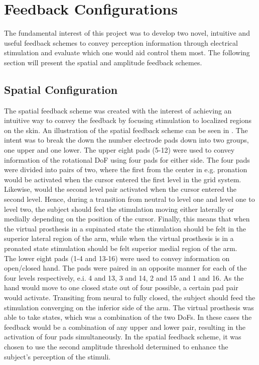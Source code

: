 \section{Feedback Configurations} \label{sec:feed}

The fundamental interest of this project was to develop two novel, intuitive and useful feedback schemes to convey perception information through electrical stimulation and evaluate which one would aid control them most. The following section will present the spatial and amplitude feedback schemes.     

\subsection{Spatial Configuration}

The spatial feedback scheme was created with the interest of achieving an intuitive way to convey the feedback by focusing stimulation to localized regions on the skin. An illustration of the spatial feedback scheme can be seen in . The intent was to break the down the number electrode pads down into two groups, one upper and one lower. The upper eight pads (5-12) were used to convey information of the rotational DoF using four pads for either side.  The four pads were divided into pairs of two, where the first from the center in e.g. pronation would be activated when the cursor entered the first level in the grid system. Likewise, would the second level pair activated when the cursor entered the second level. Hence, during a transition from neutral to level one and level one to level two, the subject should feel the stimulation moving either laterally or medially depending on the position of the cursor. Finally, this means that when the virtual prosthesis in a supinated state the stimulation should be felt in the superior lateral region of the arm, while when the virtual prosthesis is in a pronated state stimulation should be felt superior medial region of the arm.   \\
The lower eight pads (1-4 and 13-16) were used to convey information on open/closed hand. The pads were paired in an opposite manner for each of the four levels respectively, e.i. 4 and 13, 3 and 14, 2 and 15 and 1 and 16. As the hand would move to one closed state out of four possible, a certain pad pair would activate. Transiting from neural to fully closed, the subject should feed the stimulation converging on the inferior side of the arm. The virtual prosthesis was able to take states, which was a combination of the two DoFs. In these cases the feedback would be a combination of any upper and lower pair, resulting in the activation of four pads simultaneously. In the spatial feedback scheme, it was chosen to use the second amplitude threshold determined to enhance the subject's perception of the stimuli. 

